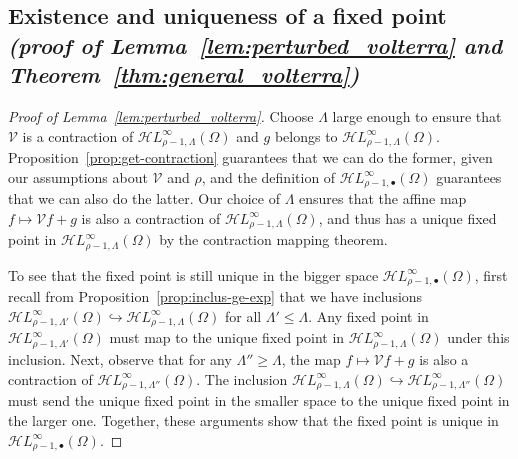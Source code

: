 \documentclass{article}
\theoremstyle{definition}
\theoremstyle{plain}
\newcommand{\singexp}[2]{\mathcal{H}L^\infty_{#1, #2}}
\newcommand{\singexpalg}[1]{\singexp{#1}{\bullet}}
\newcommand{\volterra}{\mathcal{V}}
\begin{document}
\subsection{Existence and uniqueness of a fixed point \\ \textit{(proof of Lemma~\ref{lem:perturbed_volterra} and Theorem~\ref{thm:general_volterra})}}\label{sec:existence and uniqueness}
\begin{proof}[Proof of Lemma~\ref{lem:perturbed_volterra}]
Choose $\Lambda$ large enough to ensure that $\volterra$ is a contraction of $\singexp{\rho-1}{\Lambda}(\Omega)$ and $g$ belongs to $\singexp{\rho-1}{\Lambda}(\Omega)$. Proposition~\ref{prop:get-contraction} guarantees that we can do the former, given our assumptions about $\volterra$ and $\rho$, and the definition of $\singexpalg{\rho-1}(\Omega)$ guarantees that we can also do the latter. Our choice of $\Lambda$ ensures that the affine map $f \mapsto \volterra f + g$ is also a contraction of $\singexp{\rho-1}{\Lambda}(\Omega)$, and thus has a unique fixed point in $\singexp{\rho-1}{\Lambda}(\Omega)$ by the contraction mapping theorem.

To see that the fixed point is still unique in the bigger space $\singexpalg{\rho-1}(\Omega)$, first recall from Proposition~\ref{prop:inclus-ge-exp} that we have inclusions $\singexp{\rho-1}{\Lambda'}(\Omega) \hookrightarrow \singexp{\rho-1}{\Lambda}(\Omega)$ for all $\Lambda' \le \Lambda$. Any fixed point in $\singexp{\rho-1}{\Lambda'}(\Omega)$ must map to the unique fixed point in $\singexp{\rho-1}{\Lambda}(\Omega)$ under this inclusion. Next, observe that for any $\Lambda'' \ge \Lambda$, the map $f \mapsto \volterra f + g$ is also a contraction of $\singexp{\rho-1}{\Lambda''}(\Omega)$. The inclusion $\singexp{\rho-1}{\Lambda}(\Omega) \hookrightarrow \singexp{\rho-1}{\Lambda''}(\Omega)$ must send the unique fixed point in the smaller space to the unique fixed point in the larger one. Together, these arguments show that the fixed point is unique in $\singexpalg{\rho-1}(\Omega)$.
\end{proof}
\end{document}

